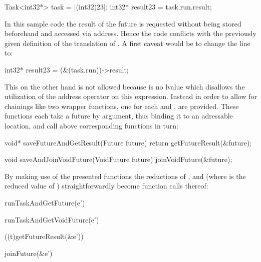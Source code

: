 \begin{ccode}
Task<int32*> task = |(int32)23|;
int32* result23 = task.run.result;
\end{ccode}

In this sample code the result of the future is requested without being stored beforehand and accessed via address. Hence the code conflicts with the previously given definition of the translation of . A first caveat would be to change the line to:

\begin{ccode}
int32* result23 = (&(task.run))->result;
\end{ccode}

This on the other hand is not allowed because  is no lvalue\cite[pp.~147-148]{CPrimerPlus} which disallows the utilization of the address operator on this expression. Instead in order to allow for chainings like  two wrapper functions, one for each  and , are provided. These functions each take a future by argument, thus binding it to an adressable location, and call above corresponding functions in turn:
\begin{ccode}
void* saveFutureAndGetResult(Future future) { 
  return getFutureResult(&future); 
}

void saveAndJoinVoidFuture(VoidFuture future) { 
  joinVoidFuture(&future); 
}
\end{ccode}

By making use of the presented functions the reductions of ,  and  (where  is the reduced value of ) straightforwardly become function calls thereof:

\begin{minipage}{0.5\textwidth}
\begin{ccode}
runTaskAndGetFuture(e')
\end{ccode}
\end{minipage}
\begin{minipage}{0.5\textwidth}
\begin{ccode}
runTaskAndGetVoidFuture(e')
\end{ccode}
\end{minipage}

\begin{minipage}{0.5\textwidth}
\begin{ccode}
((t)getFutureResult(&e'))
\end{ccode}
\end{minipage}
\begin{minipage}{0.5\textwidth}
\begin{ccode}
joinFuture(&e')
\end{ccode}
\end{minipage}

